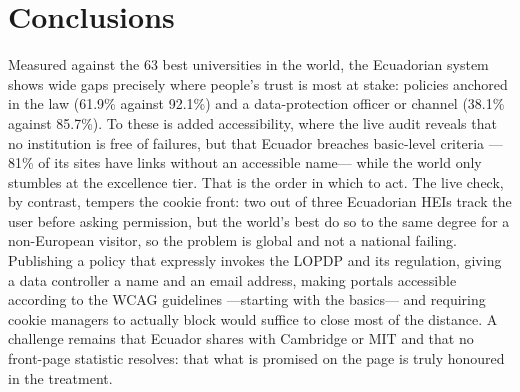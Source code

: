 \documentclass[pdflatex,sn-basic,Numbered]{sn-jnl}
\theoremstyle{thmstyleone}
\theoremstyle{thmstyletwo}
\theoremstyle{thmstylethree}
\begin{document}
\section{Conclusions}\label{sec:conclusiones}
Measured against the 63 best universities in the world, the Ecuadorian system shows wide gaps precisely where people's trust is most at stake: policies anchored in the law (61.9\% against 92.1\%) and a data-protection officer or channel (38.1\% against 85.7\%). To these is added accessibility, where the live audit reveals that no institution is free of failures, but that Ecuador breaches basic-level criteria ---81\% of its sites have links without an accessible name--- while the world only stumbles at the excellence tier. That is the order in which to act. The live check, by contrast, tempers the cookie front: two out of three Ecuadorian HEIs track the user before asking permission, but the world's best do so to the same degree for a non-European visitor, so the problem is global and not a national failing. Publishing a policy that expressly invokes the LOPDP and its regulation, giving a data controller a name and an email address, making portals accessible according to the WCAG guidelines \citep{wcag21} ---starting with the basics--- and requiring cookie managers to actually block would suffice to close most of the distance. A challenge remains that Ecuador shares with Cambridge or MIT and that no front-page statistic resolves: that what is promised on the page is truly honoured in the treatment.
\end{document}
